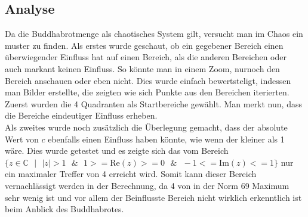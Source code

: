 \subsection{Analyse}
Da die Buddhabrotmenge als chaotisches System gilt, versucht man im Chaos ein muster zu finden. Als erstes wurde geschaut, ob ein gegebener Bereich einen überwiegender Einfluss hat auf einen Bereich, als die anderen Bereichen oder auch markant keinen Einfluss. So könnte man in einem Zoom, nurnoch den Bereich anschauen oder eben nicht. Dies wurde einfach bewertsteligt, indessen man Bilder erstellte, die zeigten wie sich Punkte aus den Bereichen iterierten. Zuerst wurden die 4 Quadranten als Startbereiche gewählt. Man merkt nun, dass die Bereiche eindeutiger Einfluss erheben.
\\
Als zweites wurde noch zusätzlich die Überlegung gemacht, dass der absolute Wert von $c$ ebenfalls einen Einfluss haben könnte, wie wenn der kleiner als 1 wäre. Dies wurde getestet und es zeigte sich das vom Bereich $\{z \in \mathbb{C}\text{ }|\text{ } |z| >1\text{ } \& \text{ } 1>=\text{Re}(z)>=0 \text{ } \& \text{ }-1<=\text{Im}(z)<=1\}$ nur ein maximaler Treffer von 4 erreicht wird. Somit kann dieser Bereich vernachlässigt werden in der Berechnung, da 4 von in der Norm 69 Maximum sehr wenig ist und vor allem der Beinflusste Bereich nicht wirklich erkenntlich ist beim Anblick des Buddhabrotes.